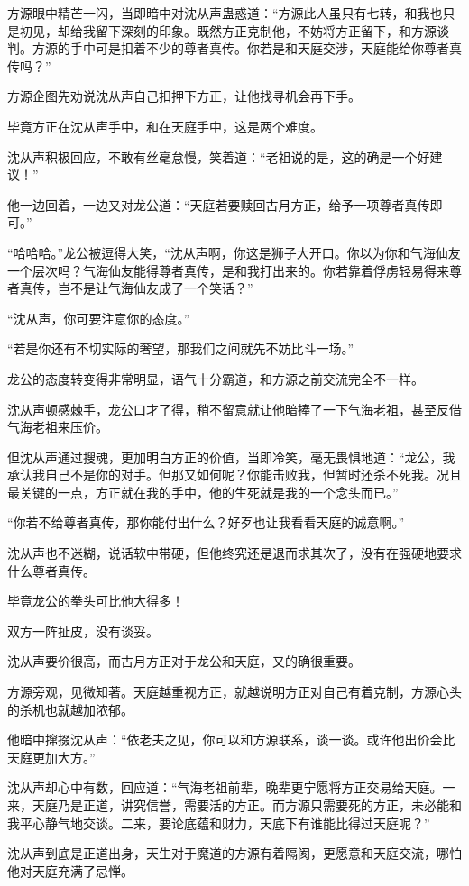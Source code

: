 \begin{this_body}
方源眼中精芒一闪，当即暗中对沈从声蛊惑道：“方源此人虽只有七转，和我也只是初见，却给我留下深刻的印象。既然方正克制他，不妨将方正留下，和方源谈判。方源的手中可是扣着不少的尊者真传。你若是和天庭交涉，天庭能给你尊者真传吗？”

方源企图先劝说沈从声自己扣押下方正，让他找寻机会再下手。

毕竟方正在沈从声手中，和在天庭手中，这是两个难度。

沈从声积极回应，不敢有丝毫怠慢，笑着道：“老祖说的是，这的确是一个好建议！”

他一边回着，一边又对龙公道：“天庭若要赎回古月方正，给予一项尊者真传即可。”

“哈哈哈。”龙公被逗得大笑，“沈从声啊，你这是狮子大开口。你以为你和气海仙友一个层次吗？气海仙友能得尊者真传，是和我打出来的。你若靠着俘虏轻易得来尊者真传，岂不是让气海仙友成了一个笑话？”

“沈从声，你可要注意你的态度。”

“若是你还有不切实际的奢望，那我们之间就先不妨比斗一场。”

龙公的态度转变得非常明显，语气十分霸道，和方源之前交流完全不一样。

沈从声顿感棘手，龙公口才了得，稍不留意就让他暗捧了一下气海老祖，甚至反借气海老祖来压价。

但沈从声通过搜魂，更加明白方正的价值，当即冷笑，毫无畏惧地道：“龙公，我承认我自己不是你的对手。但那又如何呢？你能击败我，但暂时还杀不死我。况且最关键的一点，方正就在我的手中，他的生死就是我的一个念头而已。”

“你若不给尊者真传，那你能付出什么？好歹也让我看看天庭的诚意啊。”

沈从声也不迷糊，说话软中带硬，但他终究还是退而求其次了，没有在强硬地要求什么尊者真传。

毕竟龙公的拳头可比他大得多！

双方一阵扯皮，没有谈妥。

沈从声要价很高，而古月方正对于龙公和天庭，又的确很重要。

方源旁观，见微知著。天庭越重视方正，就越说明方正对自己有着克制，方源心头的杀机也就越加浓郁。

他暗中撺掇沈从声：“依老夫之见，你可以和方源联系，谈一谈。或许他出价会比天庭更加大方。”

沈从声却心中有数，回应道：“气海老祖前辈，晚辈更宁愿将方正交易给天庭。一来，天庭乃是正道，讲究信誉，需要活的方正。而方源只需要死的方正，未必能和我平心静气地交谈。二来，要论底蕴和财力，天底下有谁能比得过天庭呢？”

沈从声到底是正道出身，天生对于魔道的方源有着隔阂，更愿意和天庭交流，哪怕他对天庭充满了忌惮。


\end{this_body}

